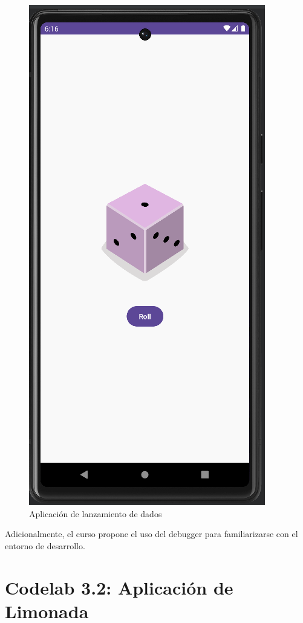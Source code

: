 \documentclass{article}
\begin{document}
     \begin{figure}[H]
        \centerline{\includegraphics[scale=0.3]{dice.png}}
        \caption{Aplicación de lanzamiento de dados}
        \label{fig:dice}
    \end{figure}

    Adicionalmente, el curso propone el uso del debugger para familiarizarse con el
     entorno de desarrollo.

    \section{Codelab 3.2: Aplicación de Limonada}
\end{document}
